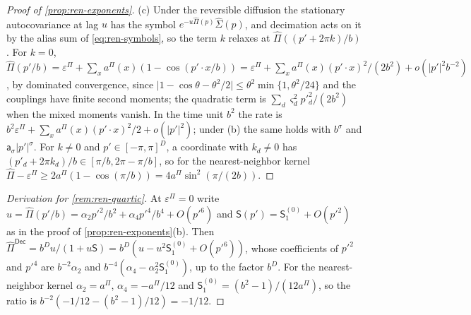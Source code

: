 \begin{proof}[Proof of \cref{prop:ren-exponents}]
(c) Under the reversible diffusion the stationary autocovariance at lag $u$ has the symbol $e^{-u\hat\Pi(p)}\hat\Sigma(p)$, and decimation acts on it by the alias sum of \eqref{eq:ren-symbols}, so the term $k$ relaxes at $\hat\Pi((p'+2\pi k)/b)$. For $k=0$, $\hat\Pi(p'/b)=\varepsilon^\Pi+\sum_xa^\Pi(x)(1-\cos(p'\cdot x/b))=\varepsilon^\Pi+\sum_xa^\Pi(x)(p'\cdot x)^2/(2b^2)+o(\lvert p'\rvert^2b^{-2})$, by dominated convergence, since $\lvert1-\cos\theta-\theta^2/2\rvert\le\theta^2\min\{1,\theta^2/24\}$ and the couplings have finite second moments; the quadratic term is $\sum_d\varsigma_d^2p'^2_d/(2b^2)$ when the mixed moments vanish. In the time unit $b^2$ the rate is $b^2\varepsilon^\Pi+\sum_xa^\Pi(x)(p'\cdot x)^2/2+o(\lvert p'\rvert^2)$; under (b) the same holds with $b^\sigma$ and $\mathsf a_\sigma\lvert p'\rvert^\sigma$. For $k\neq0$ and $p'\in[-\pi,\pi]^D$, a coordinate with $k_d\neq0$ has $(p'_d+2\pi k_d)/b\in[\pi/b,2\pi-\pi/b]$, so for the nearest-neighbor kernel $\hat\Pi-\varepsilon^\Pi\ge2a^\Pi(1-\cos(\pi/b))=4a^\Pi\sin^2(\pi/(2b))$.
\end{proof}

\begin{proof}[Derivation for \cref{rem:ren-quartic}]
At $\varepsilon^\Pi=0$ write $u=\hat\Pi(p'/b)=\alpha_2p'^2/b^2+\alpha_4p'^4/b^4+O(p'^6)$ and $\mathsf S(p')=\mathsf S^{(0)}_1+O(p'^2)$ as in the proof of \cref{prop:ren-exponents}(b). Then $\hat\Pi^{\mathsf{Dec}}=b^Du/(1+u\mathsf S)=b^D(u-u^2\mathsf S^{(0)}_1+O(p'^6))$, whose coefficients of $p'^2$ and $p'^4$ are $b^{-2}\alpha_2$ and $b^{-4}(\alpha_4-\alpha_2^2\mathsf S^{(0)}_1)$, up to the factor $b^D$. For the nearest-neighbor kernel $\alpha_2=a^\Pi$, $\alpha_4=-a^\Pi/12$ and $\mathsf S^{(0)}_1=(b^2-1)/(12a^\Pi)$, so the ratio is $b^{-2}(-1/12-(b^2-1)/12)=-1/12$.
\end{proof}

